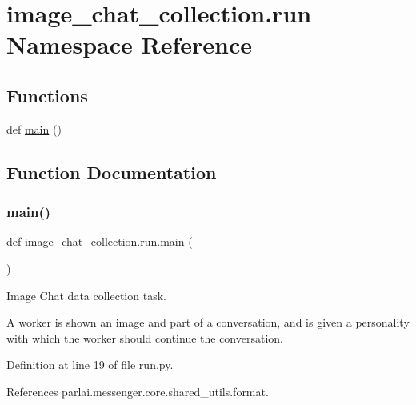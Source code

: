 \hypertarget{namespaceimage__chat__collection_1_1run}{}\section{image\+\_\+chat\+\_\+collection.\+run Namespace Reference}
\label{namespaceimage__chat__collection_1_1run}
\subsection*{Functions}
\begin{DoxyCompactItemize}
\item 
def \hyperlink{namespaceimage__chat__collection_1_1run_a703a00a419d81661c189b6603ab72769}{main} ()
\end{DoxyCompactItemize}


\subsection{Function Documentation}
\mbox{\label{namespaceimage__chat__collection_1_1run_a703a00a419d81661c189b6603ab72769}} 
\subsubsection{\texorpdfstring{main()}{main()}}
{\footnotesize\ttfamily def image\+\_\+chat\+\_\+collection.\+run.\+main (\begin{DoxyParamCaption}{ }\end{DoxyParamCaption})}

\begin{DoxyVerb}    Image Chat data collection task.

    A worker is shown an image and part of a conversation, and is given a
    personality with which the worker should continue the conversation.
\end{DoxyVerb}
 

Definition at line 19 of file run.\+py.



References parlai.\+messenger.\+core.\+shared\+\_\+utils.\+format.


